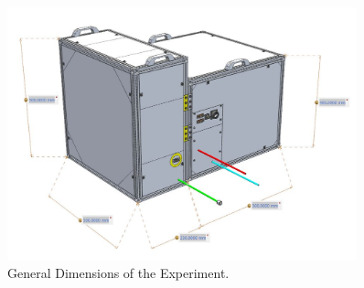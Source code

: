 \documentclass[a4paper,12pt,twoside]{article}
\providecommand{\DIFaddend}{} %
\providecommand{\DIFaddbeginFL}{} %
\providecommand{\DIFaddendFL}{} %
\providecommand{\DIFdelbeginFL}{} %
\providecommand{\DIFdelendFL}{} %
\newcommand{\DIFscaledelfig}{0.5}
\newlength{\DIFdelgraphicswidth} %
\newlength{\DIFdelgraphicsheight} %
\newcommand{\DIFaddincludegraphics}[2][]{{\color{blue}\fbox{\DIFOincludegraphics[#1]{#2}}}} %
\newcommand{\DIFdelincludegraphics}[2][]{%
\sbox{\DIFdelgraphicsbox}{\DIFOincludegraphics[#1]{#2}}%
\settoboxwidth{\DIFdelgraphicswidth}{\DIFdelgraphicsbox} %
\settoboxtotalheight{\DIFdelgraphicsheight}{\DIFdelgraphicsbox} %
\scalebox{\DIFscaledelfig}{%
\parbox[b]{\DIFdelgraphicswidth}{\usebox{\DIFdelgraphicsbox}\\[-\baselineskip] \rule{\DIFdelgraphicswidth}{0em}}\llap{\resizebox{\DIFdelgraphicswidth}{\DIFdelgraphicsheight}{%
\setlength{\unitlength}{\DIFdelgraphicswidth}%
\begin{picture}(1,1)%
\thicklines\linethickness{2pt} %
{\color[rgb]{1,0,0}\put(0,0){\framebox(1,1){}}}%
{\color[rgb]{1,0,0}\put(0,0){\line( 1,1){1}}}%
{\color[rgb]{1,0,0}\put(0,1){\line(1,-1){1}}}%
\end{picture}%
}\hspace*{3pt}}} %
} %
\DeclareRobustCommand{\DIFaddend}{\DIFOaddend \let\includegraphics\DIFOincludegraphics} %
\DeclareRobustCommand{\DIFaddbeginFL}{\DIFOaddbeginFL \let\includegraphics\DIFaddincludegraphics} %
\DeclareRobustCommand{\DIFaddendFL}{\DIFOaddendFL \let\includegraphics\DIFOincludegraphics} %
\DeclareRobustCommand{\DIFdelbeginFL}{\DIFOdelbeginFL \let\includegraphics\DIFdelincludegraphics} %
\DeclareRobustCommand{\DIFdelendFL}{\DIFOaddendFL \let\includegraphics\DIFOincludegraphics} %
\begin{document}
 \DIFaddend \begin{figure}[H]
     \centering
     \DIFdelbeginFL %
\DIFdelendFL \DIFaddbeginFL \includegraphics[width=0.9\textwidth]{4-experiment-design/img/Mechanical/tubular_dimensions.jpg}
     \DIFaddendFL \caption{General Dimensions of the Experiment.}
     \label{dimensions}
\end{figure}
\end{document}
